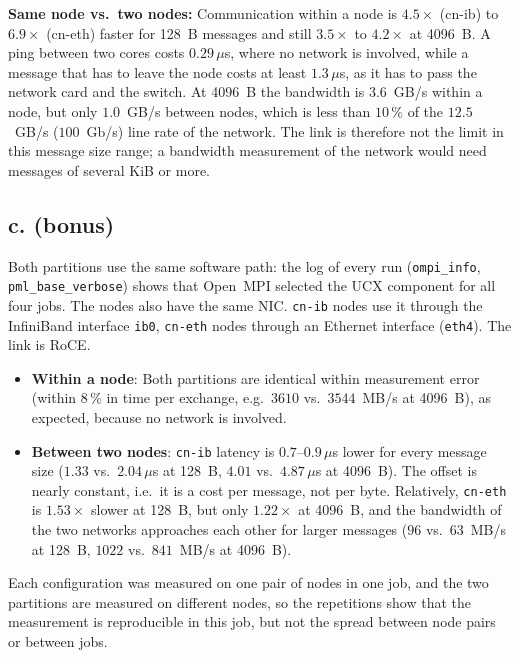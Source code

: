\documentclass[a4paper,11pt]{article}
\begin{document}
\textbf{Same node vs.\ two nodes:} Communication within a node is $4.5\times$ (cn-ib) to $6.9\times$ (cn-eth) faster
for 128~B messages and still $3.5\times$ to $4.2\times$ at 4096~B. A ping between two cores costs
$0.29\,\mu$s, where no network is involved, while a message that has to leave the node costs
at least $1.3\,\mu$s, as it has to pass the network card and the switch. At 4096~B
the bandwidth is $3.6$~GB/s within a node, but only $1.0$~GB/s between nodes, which is less than $10\,\%$ of the
$12.5$~GB/s ($100$~Gb/s) line rate of the network. The link is therefore not the limit in this message size
range; a bandwidth measurement of the network would need messages of several KiB or more.

\subsection{c. (bonus)}
Both partitions use the same software path: the log of every run (\texttt{ompi\_info}, \texttt{pml\_base\_verbose}) shows that
Open~MPI selected the UCX component for all four jobs. The nodes also have the same NIC. \texttt{cn-ib} nodes use it through the InfiniBand interface \texttt{ib0}, \texttt{cn-eth} nodes
through an Ethernet interface (\texttt{eth4}). The link is RoCE.

\begin{itemize}
    \item \textbf{Within a node}:
        Both partitions are identical within measurement error (within $8\,\%$ in time per exchange, e.g.\ $3610$
        vs.\ $3544$~MB/s at 4096~B), as expected, because no network is involved.
    \item \textbf{Between two nodes}:
        \texttt{cn-ib} latency is $0.7$--$0.9\,\mu$s
        lower for every message size ($1.33$ vs.\ $2.04\,\mu$s at 128~B, $4.01$ vs.\ $4.87\,\mu$s at 4096~B). The
        offset is nearly constant, i.e.\ it is a cost per message, not per byte. Relatively, \texttt{cn-eth} is
        $1.53\times$ slower at 128~B, but only $1.22\times$ at 4096~B, and the bandwidth of the two
        networks approaches each other for larger messages ($96$ vs.\ $63$~MB/s at 128~B, $1022$ vs.\ $841$~MB/s at 4096~B).
\end{itemize}
Each configuration was measured on one pair of nodes in one job, and the two partitions are measured on different nodes, so
the repetitions show that the measurement is reproducible in this job, but not the spread
between node pairs or between jobs.
\end{document}
